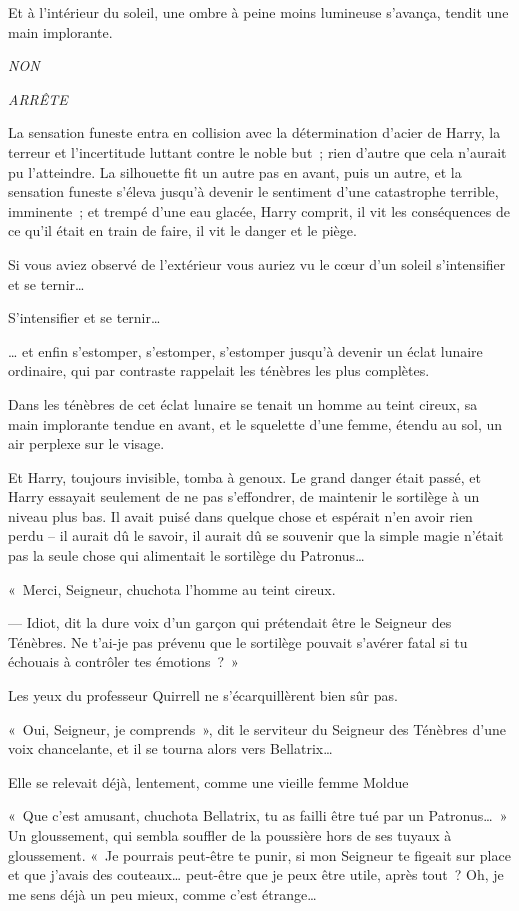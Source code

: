 Et à l'intérieur du soleil, une ombre à peine moins lumineuse s'avança, tendit une main implorante.

\emph{NON}

\emph{ARRÊTE}

La sensation funeste entra en collision avec la détermination d'acier de Harry, la terreur et l'incertitude luttant contre le noble but~; rien d'autre que cela n'aurait pu l'atteindre.
La silhouette fit un autre pas en avant, puis un autre, et la sensation funeste s'éleva jusqu'à devenir le sentiment d'une catastrophe terrible, imminente~; et trempé d'une eau glacée, Harry comprit, il vit les conséquences de ce qu'il était en train de faire, il vit le danger et le piège.

Si vous aviez observé de l'extérieur vous auriez vu le cœur d'un soleil s'intensifier et se ternir…

S'intensifier et se ternir…

… et enfin s'estomper, s'estomper, s'estomper jusqu'à devenir un éclat lunaire ordinaire, qui par contraste rappelait les ténèbres les plus complètes.

Dans les ténèbres de cet éclat lunaire se tenait un homme au teint cireux, sa main implorante tendue en avant, et le squelette d'une femme, étendu au sol, un air perplexe sur le visage.

Et Harry, toujours invisible, tomba à genoux.
Le grand danger était passé, et Harry essayait seulement de ne pas s'effondrer, de maintenir le sortilège à un niveau plus bas.
Il avait puisé dans quelque chose et espérait n'en avoir rien perdu -- il aurait dû le savoir, il aurait dû se souvenir que la simple magie n'était pas la seule chose qui alimentait le sortilège du Patronus…

«~Merci, Seigneur, chuchota l'homme au teint cireux.

--- Idiot, dit la dure voix d'un garçon qui prétendait être le Seigneur des Ténèbres.
Ne t'ai-je pas prévenu que le sortilège pouvait s'avérer fatal si tu échouais à contrôler tes émotions~?~»

Les yeux du professeur Quirrell ne s'écarquillèrent bien sûr pas.

«~Oui, Seigneur, je comprends~», dit le serviteur du Seigneur des Ténèbres d'une voix chancelante, et il se tourna alors vers Bellatrix…

Elle se relevait déjà, lentement, comme une vieille femme Moldue

 «~Que c'est amusant, chuchota Bellatrix, tu as failli être tué par un Patronus…~»
 Un gloussement, qui sembla souffler de la poussière hors de ses tuyaux à gloussement.
«~Je pourrais peut-être te punir, si mon Seigneur te figeait sur place et que j'avais des couteaux… peut-être que je peux être utile, après tout~?
Oh, je me sens déjà un peu mieux, comme c'est étrange…

